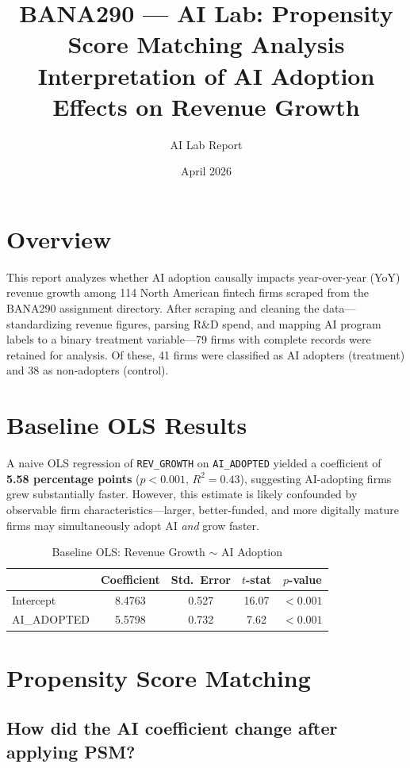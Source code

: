 \documentclass[12pt]{article}
\title{BANA290 --- AI Lab: Propensity Score Matching Analysis\\[6pt]
\large Interpretation of AI Adoption Effects on Revenue Growth}
\author{AI Lab Report}
\date{April 2026}
\begin{document}
\maketitle

\section{Overview}

This report analyzes whether AI adoption causally impacts year-over-year (YoY) revenue growth among 114 North American fintech firms scraped from the BANA290 assignment directory. After scraping and cleaning the data---standardizing revenue figures, parsing R\&D spend, and mapping AI program labels to a binary treatment variable---79 firms with complete records were retained for analysis. Of these, 41 firms were classified as AI adopters (treatment) and 38 as non-adopters (control).

\section{Baseline OLS Results}

A naive OLS regression of \texttt{REV\_GROWTH} on \texttt{AI\_ADOPTED} yielded a coefficient of \textbf{5.58 percentage points} ($p < 0.001$, $R^2 = 0.43$), suggesting AI-adopting firms grew substantially faster. However, this estimate is likely confounded by observable firm characteristics---larger, better-funded, and more digitally mature firms may simultaneously adopt AI \emph{and} grow faster.

\begin{table}[H]
\centering
\caption{Baseline OLS: Revenue Growth $\sim$ AI Adoption}
\begin{tabular}{lcccc}
\toprule
 & Coefficient & Std.\ Error & $t$-stat & $p$-value \\
\midrule
Intercept & 8.4763 & 0.527 & 16.07 & $< 0.001$ \\
AI\_ADOPTED & 5.5798 & 0.732 & 7.62 & $< 0.001$ \\
\bottomrule
\end{tabular}
\end{table}

\section{Propensity Score Matching}

\subsection{How did the AI coefficient change after applying PSM?}
\end{document}
